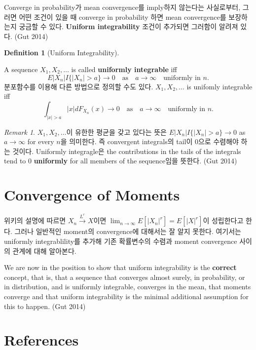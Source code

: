 \documentclass[
  letterpaper,
  DIV=11,
  numbers=noendperiod]{scrreprt}
\theoremstyle{plain}
\theoremstyle{definition}
\theoremstyle{definition}
\newtheorem{definition}{Definition}[chapter]
\theoremstyle{plain}
\theoremstyle{plain}
\theoremstyle{remark}
\newtheorem*{remark}{Remark}
\begin{document}
Converge in probability가 mean convergence를 imply하지 않는다는
사실로부터, 그러면 어떤 조건이 있을 때 converge in probability 하면 mean
convergence를 보장하는지 궁금할 수 있다. \textbf{Uniform integrability}
조건이 추가되면 그러함이 알려져 있다. (Gut 2014)

\begin{definition}[Uniform
Integrability]\protect\hypertarget{def-uintegrability}{}\label{def-uintegrability}

A sequence \(X_1, X_2, \ldots\) is called \textbf{uniformly integrable}
iff \[
E|X_n|I\{ |X_n| > a\} \rightarrow 0 \quad{} \text{as} \quad{} a \rightarrow \infty \quad{} \text{uniformly in } n.
\] 분포함수를 이용해 다른 방법으로 정의할 수도 있다. \(X_1, X_2,\ldots\)
is unifomly integrable iff \[
\int_{|x|>a} |x|dF_{X_n}(x)\rightarrow 0 \quad{} \text{as} \quad{} a \rightarrow \infty \quad{} \text{uniformly in } n.
\]

\end{definition}

\begin{remark}
\(X_1, X_2 , \ldots\)이 유한한 평균을 갖고 있다는 뜻은
\(E|X_n|I\{|X_n|>a\}\rightarrow 0\) as \(a \rightarrow \infty\) for
every \(n\)을 의미한다. 즉 convergent integrals의 tail이 0으로 수렴해야
하는 것이다. Uniformly integragle은 the contributions in the tails of
the integrals tend to \(0\) \textbf{uniformly} for all members of the
sequence임을 뜻한다. (Gut 2014)
\end{remark}

\section{Convergence of Moments}\label{convergence-of-moments}

위키의 설명에 따르면 \(X_n \stackrel{L^r}{\rightarrow}X\)이면
\(\lim_{n\rightarrow \infty}E[|X_n|^r] = E[|X|^r]\)이 성립한다고 한다.
그러나 일반적인 moment의 convergence에 대해서는 잘 알지 못한다. 여기서는
uniformly integrablility를 추가해 기존 확률변수의 수렴과 moment
convergence 사이의 관계에 대해 알아본다.

We are now in the position to show that uniform integrability is the
\textbf{correct} concept, that is, that a sequence that converges almost
surely, in probability, or in distribution, and is uniformly integrable,
converges in the mean, that moments converge and that uniform
integrability is the minimal additional assumption for this to happen.
(Gut 2014)

\section{References}\label{references}
\end{document}
